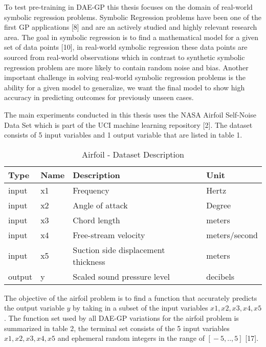 \documentclass[
  11pt,
]{article}
\begin{document}
To test pre-training in DAE-GP this thesis focuses on the domain of
real-world symbolic regression problems. Symbolic Regression problems
have been one of the first GP applications {[}8{]} and are an actively
studied and highly relevant research area. The goal in symbolic
regression is to find a mathematical model for a given set of data
points {[}10{]}, in real-world symbolic regression these data points are
sourced from real-world observations which in contrast to synthetic
symbolic regression problem are more likely to contain random noise and
bias. Another important challenge in solving real-world symbolic
regression problems is the ability for a given model to generalize, we
want the final model to show high accuracy in predicting outcomes for
previously unseen cases.

The main experiments conducted in this thesis uses the NASA Airfoil
Self-Noise Data Set which is part of the UCI machine learning repository
{[}2{]}. The dataset consists of 5 input variables and 1 output variable
that are listed in table 1.

\begin{table}[!h]

\caption{\label{tab:airfoil_dataset_description}Airfoil - Dataset Description}
\centering
\begin{tabular}[t]{l|l|l|l}
\hline
\textbf{Type} & \textbf{Name} & \textbf{Description} & \textbf{Unit}\\
\hline
input & x1 & Frequency & Hertz\\
\hline
input & x2 & Angle of attack & Degree\\
\hline
input & x3 & Chord length & meters\\
\hline
input & x4 & Free-stream velocity & meters/second\\
\hline
input & x5 & Suction side displacement thickness & meters\\
\hline
output & y & Scaled sound pressure level & decibels\\
\hline
\end{tabular}
\end{table}

The objective of the airfoil problem is to find a function that
accurately predicts the output variable \(y\) by taking in a subset of
the input variables \(x1,x2,x3,x4,x5\). The function set used by all
DAE-GP variations for the airfoil problem is summarized in table 2, the
terminal set consists of the 5 input variables \(x1,x2,x3,x4,x5\) and
ephemeral random integers in the range of \([{}-5,..,5]\) {[}17{]}.
\end{document}
